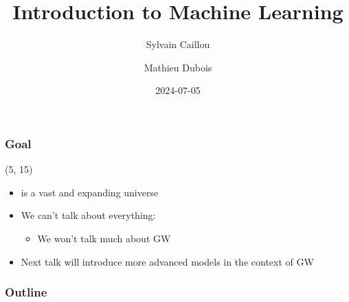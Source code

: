 \documentclass[10pt]{beamer}
\title{Introduction to Machine Learning}
\author{Sylvain Caillou \and Mathieu Dubois}
\institute{L2IT}
\date{2024-07-05}
\begin{document}
\frame{\titlepage}


\begin{frame}
  \frametitle{Goal}

  \begin{textblock}{90}(5, 15)
    \begin{itemize}
    \item {} is a vast and expanding universe 
    \item<3-> We can't talk about everything:
      \begin{itemize}
      \item<4-> We won't talk much about GW
      \end{itemize}
    \item<5-> Next talk will introduce more advanced models in the context of GW
    \end{itemize}
  \end{textblock}
\end{frame}


\begin{frame}
  \frametitle{Outline}
  \tableofcontents[hidesubsections]
\end{frame}







%

\appendix





%
\end{document}
